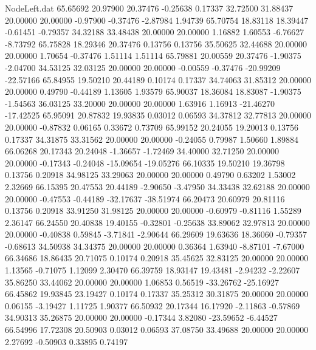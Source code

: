 \begin{filecontents}{NodeLeft.dat}
  65.65692   20.97900   20.37476    -0.25638    0.17337   32.72500   31.88437   20.00000   20.00000   -0.97900   -0.37476   -2.87984    1.94739
  65.70754   18.83118   18.39447    -0.61451   -0.79357   34.32188   33.48438   20.00000   20.00000    1.16882    1.60553   -6.76627   -8.73792
  65.75828   18.29346   20.37476     0.13756    0.13756   35.50625   32.44688   20.00000   20.00000    1.70654   -0.37476    1.51114    1.51114
  65.79881   20.00559   20.37476    -1.90375   -2.04700   34.53125   32.03125   20.00000   20.00000   -0.00559   -0.37476  -20.99209  -22.57166
  65.84955   19.50210   20.44189     0.10174    0.17337   34.74063   31.85312   20.00000   20.00000    0.49790   -0.44189    1.13605    1.93579
  65.90037   18.36084   18.83087    -1.90375   -1.54563   36.03125   33.20000   20.00000   20.00000    1.63916    1.16913  -21.46270  -17.42525
  65.95091   20.87832   19.93835     0.03012    0.06593   34.37812   32.77813   20.00000   20.00000   -0.87832    0.06165    0.33672    0.73709
  65.99152   20.24055   19.20013     0.13756    0.17337   34.31875   33.31562   20.00000   20.00000   -0.24055    0.79987    1.50660    1.89884
  66.06268   20.17343   20.24048    -1.36657   -1.72469   34.40000   32.71250   20.00000   20.00000   -0.17343   -0.24048  -15.09654  -19.05276
  66.10335   19.50210   19.36798     0.13756    0.20918   34.98125   33.29063   20.00000   20.00000    0.49790    0.63202    1.53002    2.32669
  66.15395   20.47553   20.44189    -2.90650   -3.47950   34.33438   32.62188   20.00000   20.00000   -0.47553   -0.44189  -32.17637  -38.51974
  66.20473   20.60979   20.81116     0.13756    0.20918   33.91250   31.98125   20.00000   20.00000   -0.60979   -0.81116    1.55289    2.36147
  66.24550   20.40838   19.40155    -0.32801   -0.25638   33.89062   32.97813   20.00000   20.00000   -0.40838    0.59845   -3.71841   -2.90644
  66.29609   19.63636   18.36060    -0.79357   -0.68613   34.50938   34.34375   20.00000   20.00000    0.36364    1.63940   -8.87101   -7.67000
  66.34686   18.86435   20.71075     0.10174    0.20918   35.45625   32.83125   20.00000   20.00000    1.13565   -0.71075    1.12099    2.30470
  66.39759   18.93147   19.43481    -2.94232   -2.22607   35.86250   33.44062   20.00000   20.00000    1.06853    0.56519  -33.26762  -25.16927
  66.45862   19.93845   23.19427     0.10174    0.17337   35.25312   30.31875   20.00000   20.00000    0.06155   -3.19427    1.11725    1.90377
  66.50932   20.17344   16.17920    -2.11863   -0.57869   34.90313   35.26875   20.00000   20.00000   -0.17344    3.82080  -23.59652   -6.44527
  66.54996   17.72308   20.50903     0.03012    0.06593   37.08750   33.49688   20.00000   20.00000    2.27692   -0.50903    0.33895    0.74197

\end{filecontents}
